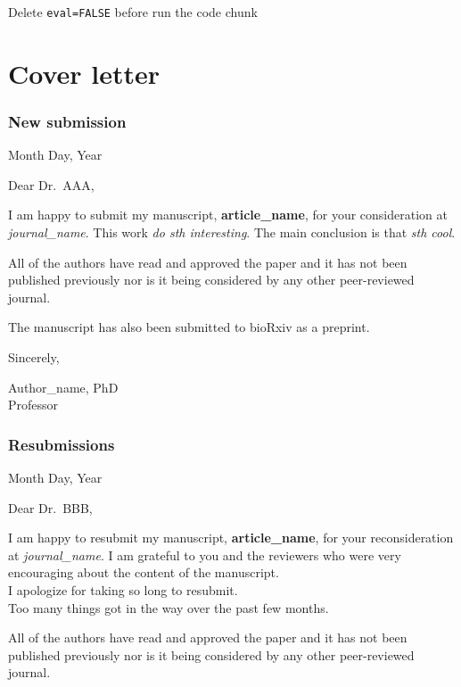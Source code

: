 \documentclass[review]{elsarticle} %
\begin{document}
Delete \texttt{eval=FALSE} before run the code chunk

\newpage

\section*{Cover letter}\label{cover-letter}

\subsubsection*{New submission}\label{new-submission}

Month Day, Year

Dear Dr.~AAA,

I am happy to submit my manuscript, \textbf{article\_name}, for your
consideration at \emph{journal\_name}. This work \emph{do sth
interesting}. The main conclusion is that \emph{sth cool}.

All of the authors have read and approved the paper and it has not been
published previously nor is it being considered by any other
peer-reviewed journal.

The manuscript has also been submitted to bioRxiv as a preprint.

Sincerely,

Author\_name, PhD\\
Professor

\subsubsection*{Resubmissions}\label{resubmissions}

Month Day, Year

Dear Dr.~BBB,

I am happy to resubmit my manuscript, \textbf{article\_name}, for your
reconsideration at \emph{journal\_name}. I am grateful to you and the
reviewers who were very encouraging about the content of the
manuscript.\\
I apologize for taking so long to resubmit.\\
Too many things got in the way over the past few months.

All of the authors have read and approved the paper and it has not been
published previously nor is it being considered by any other
peer-reviewed journal.
\end{document}
